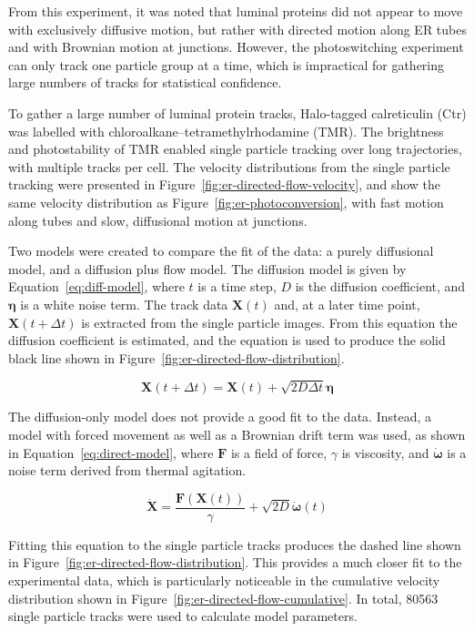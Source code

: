 From this experiment, it was noted that luminal proteins did not appear to move with exclusively diffusive motion, but rather with directed motion along ER tubes and with Brownian motion at junctions. 
However, the photoswitching experiment can only track one particle group at a time, which is impractical for gathering large numbers of tracks for statistical confidence. 

To gather a large number of luminal protein tracks, Halo-tagged calreticulin (Ctr) was labelled with chloroalkane–tetramethylrhodamine (TMR). 
The brightness and photostability of TMR enabled single particle tracking over long trajectories, with multiple tracks per cell. 
The velocity distributions from the single particle tracking were presented in Figure~\ref{fig:er-directed-flow-velocity}, and show the same velocity distribution as Figure~\ref{fig:er-photoconversion}, with fast motion along tubes and slow, diffusional motion at junctions. 

Two models were created to compare the fit of the data: a purely diffusional model, and a diffusion plus flow model. 
The diffusion model is given by Equation~\ref{eq:diff-model}, where $t$ is a time step, $D$ is the diffusion coefficient, and $\mathbf{\eta}$ is a white noise term. The track data $\mathbf{X}(t)$ and, at a later time point, $\mathbf{X}(t + \Delta t)$ is extracted from the single particle images. 
From this equation the diffusion coefficient is estimated, and the equation is used to produce the solid black line shown in Figure~\ref{fig:er-directed-flow-distribution}. 

\begin{equation} \label{eq:diff-model}
\mathbf{X}(t + \Delta t) = \mathbf{X}(t) + \sqrt{2D\Delta t}\mathbf{\eta}
\end{equation}

The diffusion-only model does not provide a good fit to the data. 
Instead, a model with forced movement as well as a Brownian drift term was used, as shown in Equation~\ref{eq:direct-model}, where $\mathbf{F}$ is a field of force, $\gamma$ is viscosity, and $\mathbf{\dot{\omega}}$ is a noise term derived from thermal agitation.

\begin{equation} \label{eq:direct-model}
\mathbf{\dot{X}} = \frac{\mathbf{F}(\mathbf{X}(t))}{\gamma} + \sqrt{2D}\mathbf{\dot{\omega}}(t)
\end{equation}

Fitting this equation to the single particle tracks produces the dashed line shown in Figure~\ref{fig:er-directed-flow-distribution}. 
This provides a much closer fit to the experimental data, which is particularly noticeable in the cumulative velocity distribution shown in Figure~\ref{fig:er-directed-flow-cumulative}.
In total, \num{80563} single particle tracks were used to calculate model parameters. 

